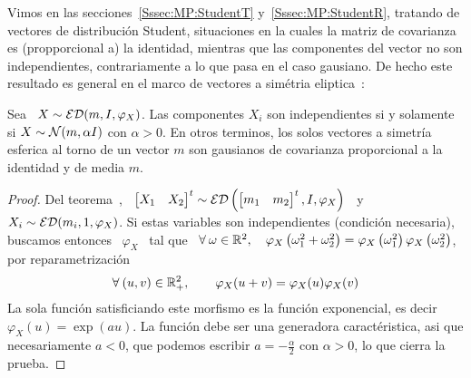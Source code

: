 Vimos   en   las  secciones~\ref{Sssec:MP:StudentT}   y~\ref{Sssec:MP:StudentR},
tratando  de vectores  de distribuci\'on  Student, situaciones  en la  cuales la
matriz  de  covarianza es  (propporcional  a)  la  identidad, mientras  que  las
componentes del vector no son independientes, contrariamente a lo que pasa en el
caso gausiano.  De hecho  este resultado es  general en  el marco de  vectores a
sim\'etria eliptica~\cite{BilBre99, Max67}:
%
\begin{teorema}
  Sea \ $X \sim \mathcal{ED}(m,I,\varphi_X)$. Las componentes $X_i$ son independientes si
  y solamente si $X  \sim \mathcal{N}(m, \alpha I)$ con $\alpha >  0$. En otros terminos,
  los  solos vectores  a  simetr\'ia esferica  al  torno de  un  vector $m$  son
  gausianos de covarianza proporcional a la identidad y de media $m$.
\end{teorema}
%
\begin{proof}
  Del teorema~\cite{Teo:MP:TranformacionAfinEliptica},  \ $\begin{bmatrix} X_1 &
    X_2    \end{bmatrix}^t     \sim    \mathcal{ED}\left(    \begin{bmatrix}     m_1    &
      m_2 \end{bmatrix}^t, I, \varphi_X \right)$ \ y  \ $X_i \sim \mathcal{ED}( m_i , 1 ,
  \varphi_X)$.  Si  estas variables son  independientes (condici\'on necesaria),
  buscamos entonces  \ $\varphi_X$ \ tal  que \ $\forall \:  \omega \in \mathbb{R}^2,
  \quad  \varphi_X\left(  \omega_1^2  +  \omega_2^2  \right)  =  \varphi_X\left(
    \omega_1^2   \right)   \varphi_X\left(    \omega_2^2   \right)$,   \ie   por
  reparametrizaci\'on
  \[
  \forall  \:   (u,v)  \in  \mathbb{R}_+^2,  \qquad   \varphi_X(u+v)  =  \varphi_X(u)
  \varphi_X(v)
  \]
  La sola funci\'on satisficiando este  morfismo es la funci\'on exponencial, es
  decir  $\varphi_X(u)  = \exp(a  u)$.  La  funci\'on  debe ser  una  generadora
  caract\'eristica, asi que necesariamente $a <  0$, que podemos escribir $a = -
  \frac{\alpha}{2}$ con $\alpha > 0$, lo que cierra la prueba.
\end{proof}

